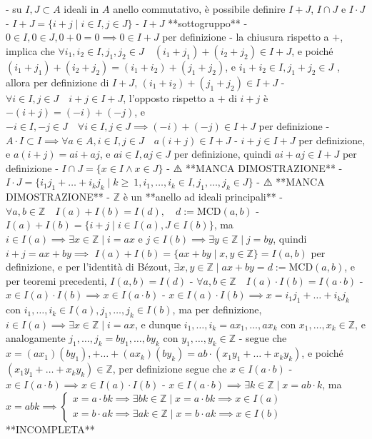 - su $I, J \subset A$ ideali in $A$ anello commutativo, è possibile definire $I + J$, $I \cap J$ e $I \cdot J$
  - $I + J = \{i + j \mid i \in I, j \in J\}$
    - $I + J$ **sottogruppo**
      - \( 0 \in I, 0 \in J, 0+0=0 \implies 0 \in I + J \) per definizione
      - la chiusura rispetto a $+$, implica che $\forall i_1, i_2 \in I, j_1, j_2 \in J \quad (i_1 + j_1) + (i_2 + j_2) \in I + J$, e poiché $(i_1 + j_1) + (i_2 + j_2) = (i_1 + i_2) + (j_1 + j_2)$, e $i_1 + i_2 \in I, j_1 + j_2 \in J$ , allora per definizione di $I + J$, $(i_1 + i_2) + (j_1 + j_2) \in I + J$
      - $\forall i \in I, j \in J \quad i + j \in I + J$, l'opposto rispetto a $+$ di $i + j$ è $- (i + j) = (-i) + (-j)$, e $-i \in I, -j \in J \quad \forall i \in I, j \in J \implies (-i) + (-j) \in I + J$ per definizione
    - $A \cdot I \subset I \implies \forall a \in A, i \in I, j \in J \quad a(i + j) \in I + J$
      - $i + j \in I + J$ per definizione, e $a(i + j) = ai + aj$, e $ai \in I, aj \in J$ per definizione, quindi $ai + aj \in I + J$ per definizione
  - $I \cap J = \{x \in I \land x \in J\}$
    - ⚠️ **MANCA DIMOSTRAZIONE**
  - $I \cdot J = \{i_1 j_1 + \ldots + i_k j_k \mid k \ge \ 1, i_1 , \ldots , i_k \in I, j_1 , \ldots , j_k \in J \}$
    - ⚠️ **MANCA DIMOSTRAZIONE**
- $\mathbb{Z}$ è un **anello ad ideali principali**
  - $\forall a, b \in \mathbb{Z} \quad I(a) + I(b) = I(d), \quad d:= \textrm{MCD}(a, b)$
    - \( I(a)+I(b)=\{i+j \mid i \in I(a), J \in I(b) \} \), ma $i \in I(a) \implies \exists x \in \mathbb{Z} \mid i = ax$ e $j \in I(b) \implies \exists y \in \mathbb{Z} \mid j = by$, quindi $i + j = ax + by \implies$ \( I(a)+I(b)=\{a x+b y \mid x, y \in \mathbb{Z}\} = I(a, b) \) per definizione, e per l'identità di Bézout, $\exists x, y \in \mathbb{Z} \mid ax + by = d := \textrm{MCD}(a, b)$, e per teoremi precedenti, $I(a, b) = I(d)$
  - \( \forall a, b \in \mathbb{Z} \quad I(a) \cdot I(b)=I(a \cdot b) \)
    - \( x \in I(a) \cdot I(b) \implies x \in I(a \cdot b) \)
      - $x \in I(a) \cdot I(b) \implies x = i_1 j_1 + \ldots + i_k j_k$ con $i_1 , \ldots , i_k \in I(a), j_1 , \ldots , j_k \in I(b)$, ma per definizione, $i \in I(a) \implies \exists x \in \mathbb{Z} \mid i = ax$, e dunque $i_1, \ldots, i_k = ax_1, \ldots, ax_k$ con $x_1, \ldots, x_k \in \mathbb{Z}$, e analogamente $j_1, \ldots, j_k = by_1, \ldots, by_k$ con $y_1, \ldots, y_k \in \mathbb{Z}$
      - segue che $x = (ax_1)(by_1),+\ldots+ (ax_k)(by_k) = ab\cdot(x_1y_1+ \ldots+ x_ky_k)$, e poiché $(x_1y_1+ \ldots+ x_ky_k) \in \mathbb{Z}$, per definizione segue che $x \in I(a\cdot b)$
    - \( x \in I(a \cdot b)  \implies x \in I(a) \cdot I(b)\)
      - $x \in I(a \cdot b) \implies \exists k \in \mathbb{Z} \mid x = ab \cdot k$, ma \( x=a b k \implies\left\{\begin{array}{l}x=a \cdot b k \implies \exists bk \in \mathbb{Z} \mid x = a \cdot bk \implies x \in I(a) \\ x=b \cdot a k \implies \exists ak \in \mathbb{Z} \mid x = b \cdot ak \implies x \in I(b)\end{array}\right. \) **INCOMPLETA**





